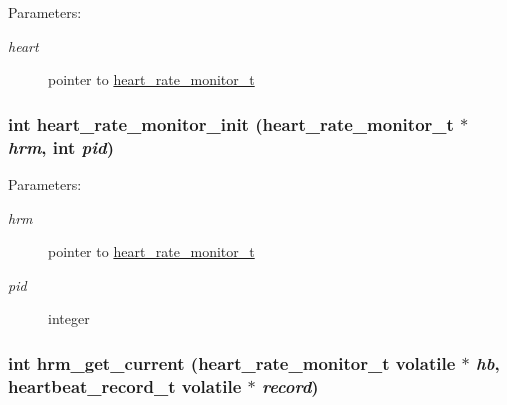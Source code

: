 \begin{Desc}
\item[Parameters:]
\begin{description}
\item[{\em heart}]pointer to \hyperlink{structheart__rate__monitor__t}{heart\_\-rate\_\-monitor\_\-t} \end{description}
\end{Desc}
\hypertarget{heart__rate__monitor-shared_8c_d49db9e81266e365b06d5c818d7e5b63}{
\subsubsection[heart\_\-rate\_\-monitor\_\-init]{\setlength{\rightskip}{0pt plus 5cm}int heart\_\-rate\_\-monitor\_\-init ({\bf heart\_\-rate\_\-monitor\_\-t} $\ast$ {\em hrm}, \/  int {\em pid})}}
\label{heart__rate__monitor-shared_8c_d49db9e81266e365b06d5c818d7e5b63}


\begin{Desc}
\item[Parameters:]
\begin{description}
\item[{\em hrm}]pointer to \hyperlink{structheart__rate__monitor__t}{heart\_\-rate\_\-monitor\_\-t} \item[{\em pid}]integer \end{description}
\end{Desc}
\hypertarget{heart__rate__monitor-shared_8c_333f4dfca799e511a797559107dea290}{
\subsubsection[hrm\_\-get\_\-current]{\setlength{\rightskip}{0pt plus 5cm}int hrm\_\-get\_\-current ({\bf heart\_\-rate\_\-monitor\_\-t} volatile $\ast$ {\em hb}, \/  {\bf heartbeat\_\-record\_\-t} volatile $\ast$ {\em record})}}
\label{heart__rate__monitor-shared_8c_333f4dfca799e511a797559107dea290}



